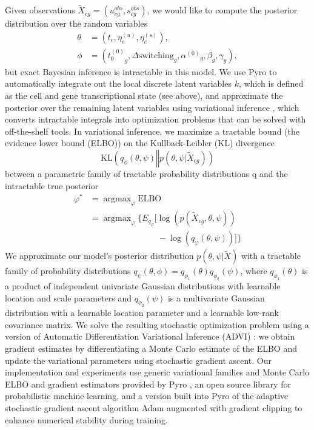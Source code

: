 \documentclass[
  sn-mathphys-num,
  lineno,
  twocolumn]{sn-jnl}
\begin{document}
Given observations
\(\tilde{X}_{cg} = \left( u_{cg}^{obs}, s_{cg}^{obs} \right)\), we would
like to compute the posterior distribution over the random variables
\begin{align}
\theta &= \left( t_{c}, \eta_{c}^{(u)}, \eta_{c}^{(s)} \right), \\
\phi &= \left( {t_{0}^{(0)}}_g, \Delta \text{switching}_{g}, 
          {\alpha^{(0)}}_{g}, \beta_{g}, \gamma_{g} \right),
\end{align} but exact Bayesian inference is intractable in this model.
We use Pyro to automatically integrate out the local discrete latent
variables \(k\), which is defined as the cell and gene transcriptional
state (see above), and approximate the posterior over the remaining
latent variables using variational inference
\citep{Bingham2018-id, Kucukelbir2016-bk}, which converts intractable
integrals into optimization problems that can be solved with
off-the-shelf tools. In variational inference, we maximize a tractable
bound (the evidence lower bound (ELBO)) on the Kullback-Leibler (KL)
divergence \[
\text{KL}\left( q_{\phi}(\theta, \psi) \mathrel{\Vert} 
  p(\theta, \psi \vert \tilde{X}_{cg}) \right)
\] between a parametric family of tractable probability distributions q
and the intractable true posterior \begin{align}
\varphi^* &= \operatorname{argmax}_{\varphi} \text{ELBO} \nonumber \\
&= \operatorname{argmax}_{\varphi} \bigg\{ E_{q_{\varphi}} 
     \bigg[ \log \left(p\left(\tilde{X}_{c g}, \theta, \psi \right) \right) \nonumber\\
&\qquad\qquad\qquad\qquad -\log \left(q_{\varphi}(\theta, \psi)\right) \bigg] \bigg\}
\end{align} We approximate our model's posterior distribution
\(p( \theta, \psi \vert
\tilde{X})\) with a tractable family of probability distributions
\(q_{\psi}(\theta, \phi) = q_{\phi_1}(\theta) q_{\phi_2}(\psi)\), where
\(q_{\phi_1}(\theta)\) is a product of independent univariate Gaussian
distributions with learnable location and scale parameters and
\(q_{\phi_2}(\psi)\) is a multivariate Gaussian distribution with a
learnable location parameter and a learnable low-rank covariance matrix.
We solve the resulting stochastic optimization problem using a version
of Automatic Differentiation Variational Inference (ADVI)
\citep{Kucukelbir2016-bk}: we obtain gradient estimates by
differentiating a Monte Carlo estimate of the ELBO and update the
variational parameters using stochastic gradient ascent. Our
implementation and experiments use generic variational families and
Monte Carlo ELBO and gradient estimators provided by Pyro
\citep{Bingham2018-id}, an open source library for probabilistic machine
learning, and a version built into Pyro of the adaptive stochastic
gradient ascent algorithm Adam augmented with gradient clipping to
enhance numerical stability during training.
\end{document}
